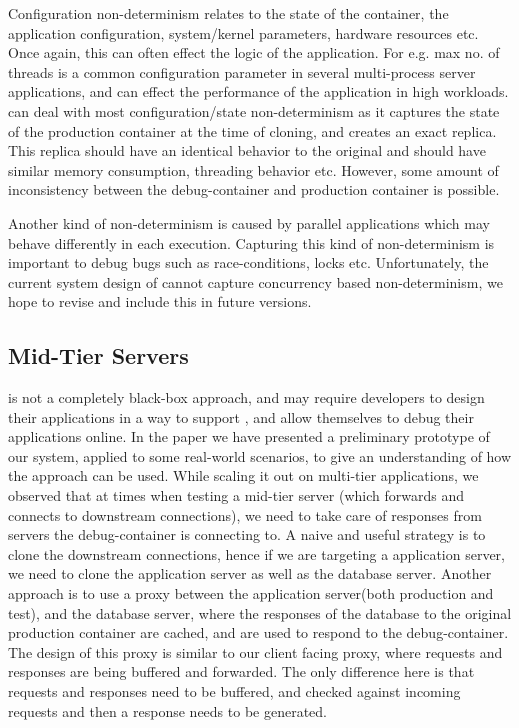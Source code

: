 Configuration non-determinism relates to the state of the container, the application configuration, system/kernel parameters, hardware resources etc.
Once again, this can often effect the logic of the application.
For e.g. max no. of threads is a common configuration parameter in several multi-process server applications, and can effect the performance of the application in high workloads.
\parikshan can deal with most configuration/state non-determinism as it captures the state of the production container at the time of cloning, and creates an exact replica.
This replica should have an identical behavior to the original and should have similar memory consumption, threading behavior etc. 
However, some amount of inconsistency between the debug-container and production container is possible.

Another kind of non-determinism is caused by parallel applications which may behave differently in each execution.
Capturing this kind of non-determinism is important to debug bugs such as race-conditions, locks etc.
Unfortunately, the current system design of \parikshan cannot capture concurrency based non-determinism, we hope to revise and include this in future versions.

\subsection{Mid-Tier Servers}
\label{sec:midTier}

\parikshan is not a completely black-box approach, and may require developers to design their applications in a way to support \parikshan, and allow themselves to debug their applications online.
In the paper we have presented a preliminary prototype of our system, applied to some real-world scenarios, to give an understanding of how the approach can be used.
While scaling it out on multi-tier applications, we observed that at times when testing a mid-tier server (which forwards and connects to downstream connections), we need to take care of responses from servers the debug-container is connecting to.
A naive and useful strategy is to clone the downstream connections, hence if we are targeting a application server, we need to clone the application server as well as the database server.
Another approach is to use a proxy between the application server(both production and test), and the database server, where the responses of the database to the original production container are cached, and are used to respond to the debug-container.
The design of this proxy is similar to our client facing proxy, where requests and responses are being buffered and forwarded. The only difference here is that requests and responses need to be buffered, and checked against incoming requests and then a response needs to be generated. 

\fi
